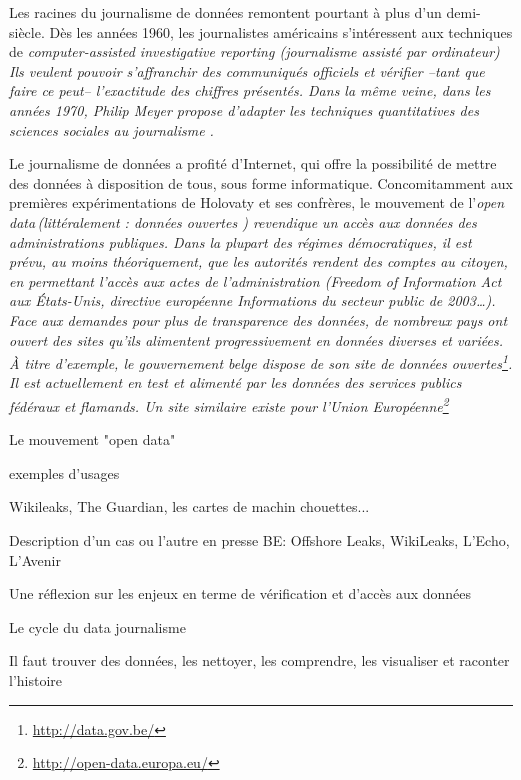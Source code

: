 Les racines du journalisme de données remontent pourtant à plus d'un demi-siècle.
Dès les années 1960, les journalistes américains s'intéressent aux techniques de
\em computer-assisted investigative reporting \em (journalisme assisté par ordinateur)
Ils veulent pouvoir s'affranchir des communiqués officiels et vérifier --tant que
faire ce peut-- l'exactitude des chiffres présentés. Dans la même veine, dans les
années 1970, Philip Meyer propose d'adapter les techniques quantitatives des 
sciences sociales au journalisme \cite{meyer}.

Le journalisme de données a profité d'Internet, qui offre la possibilité de
mettre des données à disposition de tous, sous forme informatique. Concomitamment aux 
premières expérimentations de Holovaty et ses confrères, le mouvement de 
l'\em open data\em\,(littéralement : \og données ouvertes \fg) revendique un
accès aux données des administrations publiques. Dans la plupart des régimes 
démocratiques, il est prévu, au moins théoriquement, que les autorités rendent 
des comptes au citoyen, en permettant l'accès aux actes de l'administration
(\em Freedom of Information Act\em\,aux États-Unis, directive européenne \og Informations du secteur public \fg de 2003\dots).
Face aux demandes pour plus de transparence des données, de nombreux pays ont
ouvert des sites qu'ils alimentent progressivement en données diverses et variées.
À titre d'exemple, le gouvernement belge dispose de son site de données ouvertes\footnote{\url{http://data.gov.be/}}. Il est actuellement en test et alimenté par les données des services publics fédéraux et flamands. Un site similaire existe pour l'Union Européenne\footnote{\url{http://open-data.europa.eu/}}



Le mouvement "open data"

exemples d'usages

Wikileaks, The Guardian, les cartes de machin chouettes...


Description d'un cas ou l'autre en presse BE: Offshore Leaks, WikiLeaks, L'Echo, L'Avenir

Une réflexion sur les enjeux en terme de vérification et d'accès aux données


Le cycle du data journalisme

Il faut trouver des données, les nettoyer, les comprendre, les visualiser et 
raconter l'histoire
